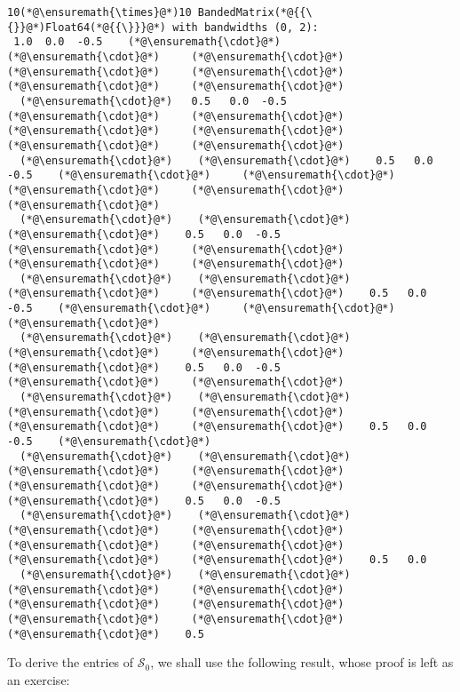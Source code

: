 \documentclass[12pt,landscape]{article}
\begin{document}
{\begin{lstlisting}
10(*@\ensuremath{\times}@*)10 BandedMatrix(*@{{\{}}@*)Float64(*@{{\}}}@*) with bandwidths (0, 2):
 1.0  0.0  -0.5    (*@\ensuremath{\cdot}@*)     (*@\ensuremath{\cdot}@*)     (*@\ensuremath{\cdot}@*)     (*@\ensuremath{\cdot}@*)     (*@\ensuremath{\cdot}@*)     (*@\ensuremath{\cdot}@*)     (*@\ensuremath{\cdot}@*) 
  (*@\ensuremath{\cdot}@*)   0.5   0.0  -0.5    (*@\ensuremath{\cdot}@*)     (*@\ensuremath{\cdot}@*)     (*@\ensuremath{\cdot}@*)     (*@\ensuremath{\cdot}@*)     (*@\ensuremath{\cdot}@*)     (*@\ensuremath{\cdot}@*) 
  (*@\ensuremath{\cdot}@*)    (*@\ensuremath{\cdot}@*)    0.5   0.0  -0.5    (*@\ensuremath{\cdot}@*)     (*@\ensuremath{\cdot}@*)     (*@\ensuremath{\cdot}@*)     (*@\ensuremath{\cdot}@*)     (*@\ensuremath{\cdot}@*) 
  (*@\ensuremath{\cdot}@*)    (*@\ensuremath{\cdot}@*)     (*@\ensuremath{\cdot}@*)    0.5   0.0  -0.5    (*@\ensuremath{\cdot}@*)     (*@\ensuremath{\cdot}@*)     (*@\ensuremath{\cdot}@*)     (*@\ensuremath{\cdot}@*) 
  (*@\ensuremath{\cdot}@*)    (*@\ensuremath{\cdot}@*)     (*@\ensuremath{\cdot}@*)     (*@\ensuremath{\cdot}@*)    0.5   0.0  -0.5    (*@\ensuremath{\cdot}@*)     (*@\ensuremath{\cdot}@*)     (*@\ensuremath{\cdot}@*) 
  (*@\ensuremath{\cdot}@*)    (*@\ensuremath{\cdot}@*)     (*@\ensuremath{\cdot}@*)     (*@\ensuremath{\cdot}@*)     (*@\ensuremath{\cdot}@*)    0.5   0.0  -0.5    (*@\ensuremath{\cdot}@*)     (*@\ensuremath{\cdot}@*) 
  (*@\ensuremath{\cdot}@*)    (*@\ensuremath{\cdot}@*)     (*@\ensuremath{\cdot}@*)     (*@\ensuremath{\cdot}@*)     (*@\ensuremath{\cdot}@*)     (*@\ensuremath{\cdot}@*)    0.5   0.0  -0.5    (*@\ensuremath{\cdot}@*) 
  (*@\ensuremath{\cdot}@*)    (*@\ensuremath{\cdot}@*)     (*@\ensuremath{\cdot}@*)     (*@\ensuremath{\cdot}@*)     (*@\ensuremath{\cdot}@*)     (*@\ensuremath{\cdot}@*)     (*@\ensuremath{\cdot}@*)    0.5   0.0  -0.5
  (*@\ensuremath{\cdot}@*)    (*@\ensuremath{\cdot}@*)     (*@\ensuremath{\cdot}@*)     (*@\ensuremath{\cdot}@*)     (*@\ensuremath{\cdot}@*)     (*@\ensuremath{\cdot}@*)     (*@\ensuremath{\cdot}@*)     (*@\ensuremath{\cdot}@*)    0.5   0.0
  (*@\ensuremath{\cdot}@*)    (*@\ensuremath{\cdot}@*)     (*@\ensuremath{\cdot}@*)     (*@\ensuremath{\cdot}@*)     (*@\ensuremath{\cdot}@*)     (*@\ensuremath{\cdot}@*)     (*@\ensuremath{\cdot}@*)     (*@\ensuremath{\cdot}@*)     (*@\ensuremath{\cdot}@*)    0.5
\end{lstlisting}


To derive the entries of $\mathcal{S}_0$, we shall use the following result, whose proof is left as an exercise:

}
\end{document}
